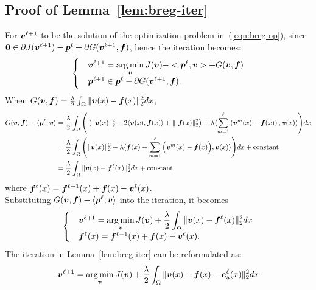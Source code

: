 \subsection{Proof of Lemma~\ref{lem:breg-iter}}
\label{secapp:breg-iter}
For ${\bm v}^{\ell + 1}$ to be the solution of the optimization problem in~(\ref{eqn:breg-op}), since $\bm{0} \in \partial J({\bm v}^{\ell + 1}) - \bm{p}^{\ell} + \partial G({\bm v}^{\ell + 1}, {\bm f})$, hence the iteration becomes:
\begin{equation}
\nonumber
\begin{cases} 
& {\bm v}^{\ell + 1} = \displaystyle \operatorname*{arg\,min}_{{\bm v}} J({\bm v}) - <\bm{p}^{\ell}, {\bm v}> + G({\bm v}, {\bm f}) \\
& \bm{p}^{\ell + 1} \in \bm{p}^{\ell} - \partial G({\bm v}^{\ell + 1}, {\bm f}). 
\end{cases}
\end{equation}
When $G({\bm v}, {\bm f}) = \frac{\lambda}{2}  \int_{\Omega} \|{\bm v}(x) - {\bm f}(x)\|_2^2 dx$,
\begin{equation}
\nonumber
\begin{aligned}
G({\bm v}, {\bm f}) - \langle\bm{p}^{\ell}, {\bm v}\rangle &= \frac{\lambda}{2} \int_{\Omega}\Bigg(  \left(  \|{\bm v}(x)\|_2^2 -2\langle{\bm v}(x), {\bm f}(x)\rangle + \|\ {\bm f}(x)\|_2^2 \right ) + \lambda\langle\sum^{\ell}_{m = 1} \left({\bm v}^m(x) - {\bm f}(x) \right), {\bm v}(x)\rangle \Bigg) dx \\
&= \frac{\lambda}{2} \int_{\Omega} \Bigg( \|{\bm v}(x)\|_2^2 - \lambda\langle{\bm f}(x) - \sum^{\ell}_{m = 1}\Big( {\bm v}^m(x) - {\bm f}(x) \Big), {\bm v}(x)\rangle\Bigg) dx + \text{constant}\\
&= \frac{\lambda}{2} \int_{\Omega} \|{\bm v}(x) - {\bm f}^{\ell}(x)\|_2^2 dx + \text{constant},
\end{aligned}
\end{equation}
where ${\bm f}^{\ell}(x) = {\bm f}^{\ell - 1}(x) + {\bm f}(x) - {\bm v}^{\ell}(x)$. \\
Substituting $G({\bm v}, {\bm f}) - \langle\bm{p}^{\ell}, {\bm v}\rangle$ into the iteration, it becomes
\begin{equation}
\begin{cases}
   & {\bm v}^{\ell + 1} = \displaystyle \operatorname*{arg\,min}_{{\bm v}} J({\bm v}) + \frac{\lambda}{2} \int_{\Omega} \|{\bm v}(x) - {\bm f}^{\ell}(x)\|_2^2 dx \\
 & {\bm f}^{\ell}(x) = {\bm f}^{\ell - 1}(x) + {\bm f}(x) - {\bm v}^{\ell}(x).
    \end{cases}
\end{equation}
The iteration in Lemma~\ref{lem:breg-iter} can be reformulated as:
\begin{equation}
\nonumber
   {\bm v}^{\ell + 1} = \displaystyle \operatorname*{arg\,min}_{{\bm v}} J({\bm v}) + \frac{\lambda}{2} \int_{\Omega} \|{\bm v}(x) - {\bm f}(x) - \bm{e}_{\mathrm{a}}^{\ell}(x)\|_2^2 dx \\
\end{equation}
